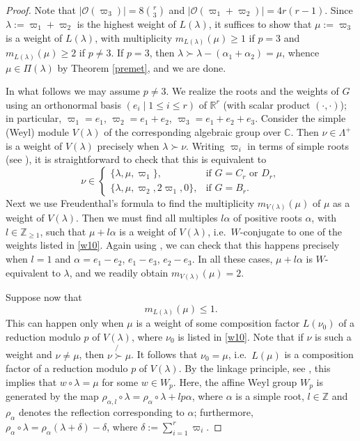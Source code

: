 \documentclass[11pt]{amsart}
\theoremstyle{plain}
\theoremstyle{definition}
\numberwithin{thm}{section}
\numberwithin{equation}{thm}
\newcommand{\al}{\alpha}
\newcommand{\om}{\varpi}
\newcommand{\sO}{{\mathcal O}}
\newcommand{\C}{{\mathbb C}}
\newcommand{\R}{{\mathbb R}}
\newcommand{\Z}{{\mathbb Z}}
\newcommand{\0}{\emptyset}
\newcommand{\LP}{{\Lambda^{+}}}
\newcommand{\lam}{\lambda}
\begin{document}
\begin{proof}
Note that $|\sO(\om_3)| = 8\binom{r}{3}$ and $|\sO(\om_1+\om_2)| = 4r(r-1)$. Since $\lam:=\om_1+\om_2$ is the highest weight of
$L(\lam)$, it suffices to show that $\mu:=\om_3$ is a weight of $L(\lam)$, with multiplicity $m_{L(\lam)}(\mu)\geq 1$ if $p=3$ and 
$m_{L(\lam)}(\mu) \geq 2$ if 
$p \neq 3$. If $p=3$, then $\lam \succ \lam-(\al_1+\al_2) = \mu$, whence $\mu \in \Pi(\lam)$ by Theorem \ref{premet}, and we are done.

In what follows we may assume $p \neq 3$. We realize the roots and the weights of $G$ using an orthonormal basis 
$(e_i \mid 1\leq i \leq r)$ of $\R^r$ (with scalar product $(\cdot,\cdot)$); 
in particular, $\om_1=e_1$, $\om_2=e_1+e_2$, $\om_3=e_1+e_2+e_3$. 
Consider the simple (Weyl) module $V(\lam)$ of the corresponding algebraic group
over $\C$. Then $\nu \in \LP$ is a weight of $V(\lam)$ precisely when $\lam \succ \nu$. Writing $\om_i$ in terms of simple roots
(see \cite[Table 2]{OV}), it is straightforward to check that this is equivalent to
\begin{equation}\label{w10}
   \nu \in \left\{ \begin{array}{ll} \{\lam,\mu, \om_1\}, & \mbox{if }G = C_r \mbox{ or }D_r,\\
   \{\lam,\mu,\om_2,2\om_1,0\}, & \mbox{if }G = B_r.\end{array} \right.
\end{equation}    
Next we use Freudenthal's formula \cite[p.\ 122]{H} to find the multiplicity $m_{V(\lam)}(\mu)$ of $\mu$ as a weight of $V(\lam)$. 
Then we must 
find all multiples $l\al$ of positive roots $\al$, with $l \in \Z_{\geq 1}$, such that $\mu+l\al$ is a weight of $V(\lam)$, i.e.\ 
$W$-conjugate to one of the weights listed in \eqref{w10}. Again using \cite[Table 2]{OV}, we can check that this happens 
precisely when $l=1$ and $\al = e_1-e_2$, $e_1-e_3$, $e_2-e_3$. In all these cases, $\mu+l\al$ is $W$-equivalent to $\lam$,
and we readily obtain $m_{V(\lam)}(\mu)=2$.

Suppose now that 
\begin{equation}\label{w11}
  m_{L(\lam)}(\mu) \leq 1. 
\end{equation}
This can happen only when $\mu$ is a weight of some composition factor 
$L(\nu_0)$ of a reduction modulo $p$ of $V(\lam)$, where $\nu_0$ is listed in \eqref{w10}. Note that if $\nu$ is such a weight
and $\nu \neq \mu$, then $\nu \not{\succ} \mu$. It follows that $\nu_0=\mu$, 
i.e.\ $L(\mu)$ is a composition factor of
a reduction modulo $p$ of $V(\lam)$. By the linkage principle, see \cite{Jan}, this implies that $w \circ \lam = \mu$ for 
some $w \in W_p$.
Here, the affine Weyl group $W_{p}$ is generated by the map $\rho_{\alpha,l} \circ \lambda = \rho_{\alpha} \circ \lambda + lp \alpha$,
where $\alpha$ is a simple root, $l \in \Z$ and $\rho_{\alpha}$ denotes the 
reflection corresponding to $\alpha$; furthermore, $\rho_\alpha \circ \lambda = \rho_\alpha(\lambda+\delta) - \delta$,
where $\delta:=\sum^r_{i=1}\om_i$.


\end{proof}
\end{document}

